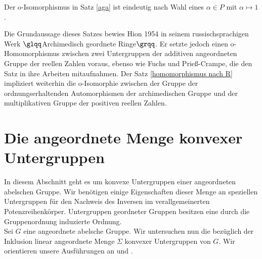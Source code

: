 %
%
%
%
%
\begin{folg}
Der o-Isomorphismus in Satz \ref{aga} ist eindeutig nach Wahl eines $\alpha \in P$ mit $\alpha \mapsto 1$.

\end{folg}
%
%
%
%
Die Grundaussage dieses Satzes bewies Hion 1954 in seinem russischsprachigen Werk $\glqq$Archimedisch geordnete Ringe$\grqq$. Er setzte jedoch einen o-Homomorphismus zwischen zwei Untergruppen der additiven angeordneten Gruppe der reellen Zahlen voraus, ebenso wie Fuchs und Prieß-Crampe, die den Satz in ihre Arbeiten mitaufnahmen.  Der Satz \ref{homomorphismus nach R} impliziert weiterhin die o-Isomorphie zwischen der Gruppe der ordnungserhaltenden Automorphismen der archimedischen Gruppe und der multiplikativen Gruppe der positiven reellen Zahlen. \cite{priesscrampe83}
%
%
%
%
%
\section{Die angeordnete Menge konvexer Untergruppen}
In diesem Abschnitt geht es um konvexe Untergruppen einer angeordneten abelschen Gruppe. Wir benötigen einige Eigenschaften dieser Menge an speziellen Untergruppen für den Nachweis des Inversen im verallgemeinerten Potenzreihenkörper. Untergruppen geordneter Gruppen besitzen eine durch die Gruppenordnung induzierte Ordnung. \\
Sei $G$ eine angeordnete abelsche Gruppe.
Wir untersuchen nun die bezüglich der Inklusion linear angeordnete Menge $\Sigma$ konvexer Untergruppen von $G$. Wir orientieren unsere Ausführungen an \cite[S. 81 - 83]{fuchs66}  und \cite[S. 3]{priesscrampe83}.

